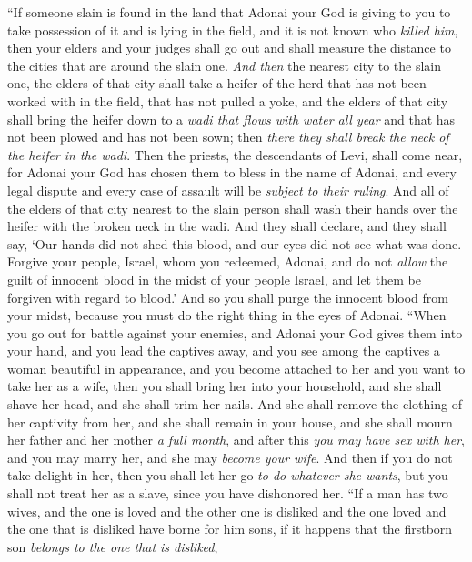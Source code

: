 \begin{biblechapter} %
\verse “If someone slain is found in the land that Adonai your God is giving to you to take possession of it and is lying in the field, and it is not known who \textit{killed him},
\verse then your elders and your judges shall go out and shall measure the distance to the cities that are around the slain one.
\verse \textit{And then} the nearest city to the slain one, the elders of that city shall take a heifer of the herd that has not been worked with in the field, that has not pulled a yoke,
\verse and the elders of that city shall bring the heifer down to a \textit{wadi that flows with water all year} and that has not been plowed and has not been sown; then \textit{there they shall break the neck of the heifer in the wadi}.
\verse Then the priests, the descendants of Levi, shall come near, for Adonai your God has chosen them to bless in the name of Adonai, and every legal dispute and every case of assault will be \textit{subject to their ruling}.
\verse And all of the elders of that city nearest to the slain person shall wash their hands over the heifer with the broken neck in the wadi.
\verse And they shall declare, and they shall say, ‘Our hands did not shed this blood, and our eyes did not see what was done.
\verse Forgive your people, Israel, whom you redeemed, Adonai, and do not \textit{allow} the guilt of innocent blood in the midst of your people Israel, and let them be forgiven with regard to blood.’
\verse And so you shall purge the innocent blood from your midst, because you must do the right thing in the eyes of Adonai.
\verse “When you go out for battle against your enemies, and Adonai your God gives them into your hand, and you lead the captives away,
\verse and you see among the captives a woman beautiful in appearance, and you become attached to her and you want to take her as a wife,
\verse then you shall bring her into your household, and she shall shave her head, and she shall trim her nails.
\verse And she shall remove the clothing of her captivity from her, and she shall remain in your house, and she shall mourn her father and her mother \textit{a full month}, and after this \textit{you may have sex with her}, and you may marry her, and she may \textit{become your wife}.
\verse And then if you do not take delight in her, then you shall let her go \textit{to do whatever she wants}, but you shall not treat her as a slave, since you have dishonored her.
\verse “If a man has two wives, and the one is loved and the other one is disliked and the one loved and the one that is disliked have borne for him sons, if it happens that the firstborn son \textit{belongs to the one that is disliked},

\end{biblechapter}

